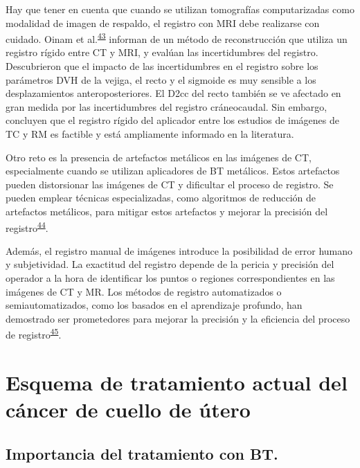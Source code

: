 \documentclass[
  a4paper,
]{scrreprt}
\begin{document}
Hay que tener en cuenta que cuando se utilizan tomografías
computarizadas como modalidad de imagen de respaldo, el registro con MRI
debe realizarse con cuidado. Oinam et
al.\textsuperscript{\protect\hyperlink{ref-oinam2014}{43}} informan de
un método de reconstrucción que utiliza un registro rígido entre CT y
MRI, y evalúan las incertidumbres del registro. Descubrieron que el
impacto de las incertidumbres en el registro sobre los parámetros DVH de
la vejiga, el recto y el sigmoide es muy sensible a los desplazamientos
anteroposteriores. El D2cc del recto también se ve afectado en gran
medida por las incertidumbres del registro cráneocaudal. Sin embargo,
concluyen que el registro rígido del aplicador entre los estudios de
imágenes de TC y RM es factible y está ampliamente informado en la
literatura.

Otro reto es la presencia de artefactos metálicos en las imágenes de CT,
especialmente cuando se utilizan aplicadores de BT metálicos. Estos
artefactos pueden distorsionar las imágenes de CT y dificultar el
proceso de registro. Se pueden emplear técnicas especializadas, como
algoritmos de reducción de artefactos metálicos, para mitigar estos
artefactos y mejorar la precisión del
registro\textsuperscript{\protect\hyperlink{ref-katsura2018}{44}}.

Además, el registro manual de imágenes introduce la posibilidad de error
humano y subjetividad. La exactitud del registro depende de la pericia y
precisión del operador a la hora de identificar los puntos o regiones
correspondientes en las imágenes de CT y MR. Los métodos de registro
automatizados o semiautomatizados, como los basados en el aprendizaje
profundo, han demostrado ser prometedores para mejorar la precisión y la
eficiencia del proceso de
registro\textsuperscript{\protect\hyperlink{ref-shi2022}{45}}.

\hypertarget{esquema-de-tratamiento-actual-del-cuxe1ncer-de-cuello-de-uxfatero}{%
\section{Esquema de tratamiento actual del cáncer de cuello de
útero}\label{esquema-de-tratamiento-actual-del-cuxe1ncer-de-cuello-de-uxfatero}}

\hypertarget{sec-braqnoopcional}{%
\subsection{Importancia del tratamiento con
BT.}\label{sec-braqnoopcional}}
\end{document}
